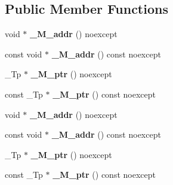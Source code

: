 \subsection*{Public Member Functions}
\begin{DoxyCompactItemize}
\item 
\hypertarget{struct____gnu__cxx_1_1____aligned__buffer_af3eddf53ea7e29348c18e184f1d0c7f9}{void $\ast$ {\bfseries \+\_\+\+M\+\_\+addr} () noexcept}\label{struct____gnu__cxx_1_1____aligned__buffer_af3eddf53ea7e29348c18e184f1d0c7f9}

\item 
\hypertarget{struct____gnu__cxx_1_1____aligned__buffer_adb35591d820effc992395165fa0e2af4}{const void $\ast$ {\bfseries \+\_\+\+M\+\_\+addr} () const noexcept}\label{struct____gnu__cxx_1_1____aligned__buffer_adb35591d820effc992395165fa0e2af4}

\item 
\hypertarget{struct____gnu__cxx_1_1____aligned__buffer_a4a8768f97594e6c1bf785d30ea3ac87b}{\+\_\+\+Tp $\ast$ {\bfseries \+\_\+\+M\+\_\+ptr} () noexcept}\label{struct____gnu__cxx_1_1____aligned__buffer_a4a8768f97594e6c1bf785d30ea3ac87b}

\item 
\hypertarget{struct____gnu__cxx_1_1____aligned__buffer_adc8b378d793d89d0878c6f92df0ab7fe}{const \+\_\+\+Tp $\ast$ {\bfseries \+\_\+\+M\+\_\+ptr} () const noexcept}\label{struct____gnu__cxx_1_1____aligned__buffer_adc8b378d793d89d0878c6f92df0ab7fe}

\item 
\hypertarget{struct____gnu__cxx_1_1____aligned__buffer_af3eddf53ea7e29348c18e184f1d0c7f9}{void $\ast$ {\bfseries \+\_\+\+M\+\_\+addr} () noexcept}\label{struct____gnu__cxx_1_1____aligned__buffer_af3eddf53ea7e29348c18e184f1d0c7f9}

\item 
\hypertarget{struct____gnu__cxx_1_1____aligned__buffer_adb35591d820effc992395165fa0e2af4}{const void $\ast$ {\bfseries \+\_\+\+M\+\_\+addr} () const noexcept}\label{struct____gnu__cxx_1_1____aligned__buffer_adb35591d820effc992395165fa0e2af4}

\item 
\hypertarget{struct____gnu__cxx_1_1____aligned__buffer_a4a8768f97594e6c1bf785d30ea3ac87b}{\+\_\+\+Tp $\ast$ {\bfseries \+\_\+\+M\+\_\+ptr} () noexcept}\label{struct____gnu__cxx_1_1____aligned__buffer_a4a8768f97594e6c1bf785d30ea3ac87b}

\item 
\hypertarget{struct____gnu__cxx_1_1____aligned__buffer_adc8b378d793d89d0878c6f92df0ab7fe}{const \+\_\+\+Tp $\ast$ {\bfseries \+\_\+\+M\+\_\+ptr} () const noexcept}\label{struct____gnu__cxx_1_1____aligned__buffer_adc8b378d793d89d0878c6f92df0ab7fe}

\end{DoxyCompactItemize}

